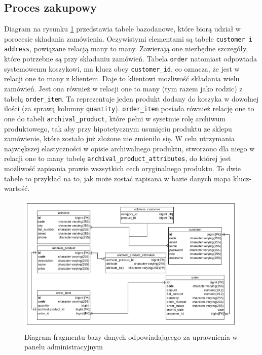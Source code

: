 \subsection{Proces zakupowy}
Diagram na rysunku \ref{db_zakup} przedstawia tabele bazodanowe, które biorą udział w porocesie składania zamówienia. Oczywistymi elementami są tabele \texttt{customer i address}, powiązane relacją many to many. Zawierają one niezbędne szczegóły, które potrzebne są przy składaniu zamówień. Tabela \texttt{order} natomiast odpowiada systemowemu koszykowi, ma klucz obcy \texttt{customer\_id}, co oznacza, że jest w relacji one to many z klientem. Daje to klientowi możliwość składania wielu zamówień. Jest ona również w relacji one to many (tym razem jako rodzic) z tabelą \texttt{order\_item}.  Ta reprezentuje jeden produkt dodany do koszyka w dowolnej ilości (za sprawą kolumny \texttt{quantity}). \texttt{order\_item} posiada również relację one to one do tabeli \texttt{archival\_product}, które pełni w sysetmie rolę archiwum produktowego, tak aby przy hipotetycznym usunięciu produktu ze sklepu zamówienie, które zostało już złożone nie zmieniło się. W celu utrzymania największej elastyczności w opisie archiwalnego produktu, stworzono dla niego w relacji one to many tabelę \texttt{archival\_product\_attributes}, do której jest możliwość zapisania prawie wszsytkich cech oryginalnego produktu. Te dwie tabele to przykład na to, jak może zostać zapisana w bazie danych mapa klucz-wartość.  

\begin{figure}
	\begin{center}
		\includegraphics[scale=0.28]{db_zakup.png}
	\end{center}
	\caption{{\color{black}Diagram fragmentu bazy danych odpowiadającego za uprawnienia w panelu administracyjnym}} \label{db_zakup}
\end{figure}

